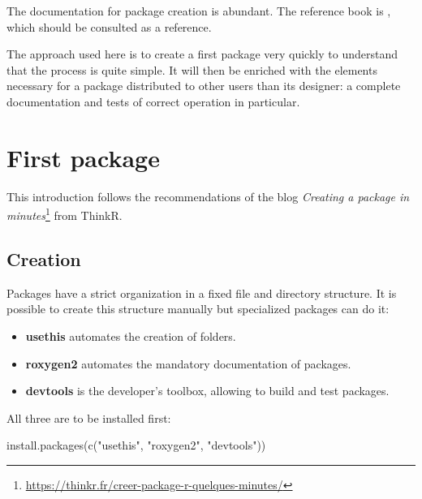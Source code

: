 \documentclass[
  12pt,
  american,
  a4paper,
  extrafontsizes,onecolumn,openright
  ]{memoir}
\newenvironment{Shaded}{\begin{snugshade}}{\end{snugshade}}
\newcommand{\FunctionTok}[1]{\textcolor[rgb]{0.00,0.00,0.00}{#1}}
\newcommand{\NormalTok}[1]{#1}
\newcommand{\StringTok}[1]{\textcolor[rgb]{0.31,0.60,0.02}{#1}}
\providecommand{\tightlist}{%
  \setlength{\itemsep}{0pt}\setlength{\parskip}{0pt}}
\begin{document}
The documentation for package creation is abundant.
The reference book is \textcite{Wickham2015}, which should be consulted as a reference.

The approach used here is to create a first package very quickly to understand that the process is quite simple.
It will then be enriched with the elements necessary for a package distributed to other users than its designer: a complete documentation and tests of correct operation in particular.

\hypertarget{first-package}{%
\section{First package}\label{first-package}}

This introduction follows the recommendations of the blog \emph{Creating a package in minutes}\footnote{\url{https://thinkr.fr/creer-package-r-quelques-minutes/}} from ThinkR.

\hypertarget{creation}{%
\subsection{Creation}\label{creation}}

Packages have a strict organization in a fixed file and directory structure.
It is possible to create this structure manually but specialized packages can do it:

\begin{itemize}
\tightlist
\item
  \textbf{usethis} automates the creation of folders.
\item
  \textbf{roxygen2} automates the mandatory documentation of packages.
\item
  \textbf{devtools} is the developer's toolbox, allowing to build and test packages.
\end{itemize}

All three are to be installed first:

\scriptsize

\begin{Shaded}
\begin{Highlighting}[]
\FunctionTok{install.packages}\NormalTok{(}\FunctionTok{c}\NormalTok{(}\StringTok{"usethis"}\NormalTok{, }\StringTok{"roxygen2"}\NormalTok{, }\StringTok{"devtools"}\NormalTok{))}
\end{Highlighting}
\end{Shaded}

\normalsize
\end{document}
